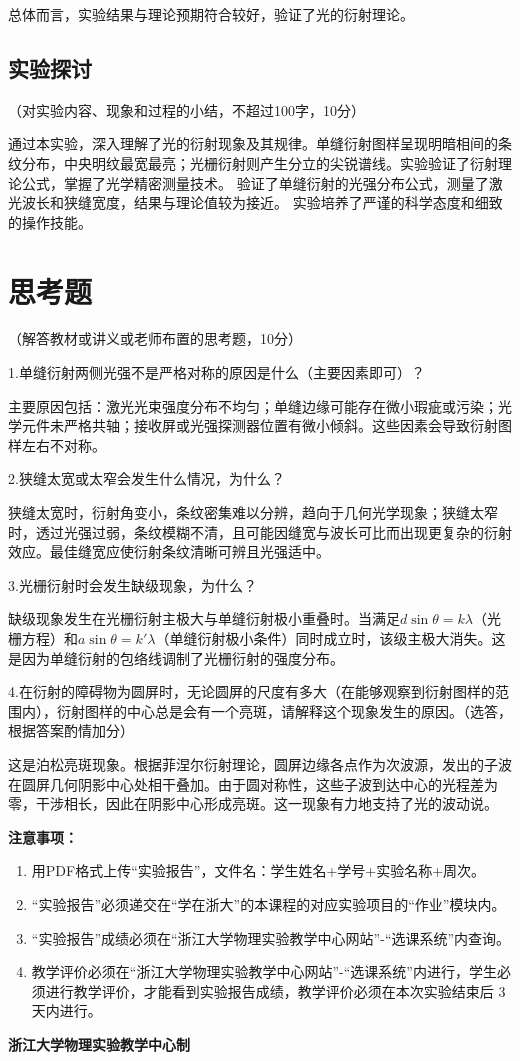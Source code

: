 \documentclass[10pt,a4paper]{ctexart}
\newcommand{\sihao}{\fontsize{14pt}{18pt}\selectfont}
\newcommand{\xiaosi}{\fontsize{12pt}{16pt}\selectfont}
\begin{document}
总体而言，实验结果与理论预期符合较好，验证了光的衍射理论。

    \subsection{实验探讨}
    \xiaosi （对实验内容、现象和过程的小结，不超过100字，10分）

    通过本实验，深入理解了光的衍射现象及其规律。单缝衍射图样呈现明暗相间的条纹分布，中央明纹最宽最亮；光栅衍射则产生分立的尖锐谱线。实验验证了衍射理论公式，掌握了光学精密测量技术。
    验证了单缝衍射的光强分布公式，测量了激光波长和狭缝宽度，结果与理论值较为接近。
    实验培养了严谨的科学态度和细致的操作技能。
\section{思考题}

    \xiaosi （解答教材或讲义或老师布置的思考题，10分）

1.单缝衍射两侧光强不是严格对称的原因是什么（主要因素即可）？

主要原因包括：激光光束强度分布不均匀；单缝边缘可能存在微小瑕疵或污染；光学元件未严格共轴；接收屏或光强探测器位置有微小倾斜。这些因素会导致衍射图样左右不对称。

2.狭缝太宽或太窄会发生什么情况，为什么？

狭缝太宽时，衍射角变小，条纹密集难以分辨，趋向于几何光学现象；狭缝太窄时，透过光强过弱，条纹模糊不清，且可能因缝宽与波长可比而出现更复杂的衍射效应。最佳缝宽应使衍射条纹清晰可辨且光强适中。

3.光栅衍射时会发生缺级现象，为什么？

缺级现象发生在光栅衍射主极大与单缝衍射极小重叠时。当满足$d\sin\theta = k\lambda$（光栅方程）和$a\sin\theta = k'\lambda$（单缝衍射极小条件）同时成立时，该级主极大消失。这是因为单缝衍射的包络线调制了光栅衍射的强度分布。

4.在衍射的障碍物为圆屏时，无论圆屏的尺度有多大（在能够观察到衍射图样的范围内），衍射图样的中心总是会有一个亮斑，请解释这个现象发生的原因。（选答，根据答案酌情加分）

这是泊松亮斑现象。根据菲涅尔衍射理论，圆屏边缘各点作为次波源，发出的子波在圆屏几何阴影中心处相干叠加。由于圆对称性，这些子波到达中心的光程差为零，干涉相长，因此在阴影中心形成亮斑。这一现象有力地支持了光的波动说。
\newpage

\sihao\textbf{注意事项：}
\xiaosi
\begin{enumerate}
    \item 用PDF格式上传“实验报告”，文件名：学生姓名+学号+实验名称+周次。
    \item  “实验报告”必须递交在“学在浙大”的本课程的对应实验项目的“作业”模块内。
    \item  “实验报告”成绩必须在“浙江大学物理实验教学中心网站”-“选课系统”内查询。
    \item 教学评价必须在“浙江大学物理实验教学中心网站”-“选课系统”内进行，学生必须进行教学评价，才能看到实验报告成绩，教学评价必须在本次实验结束后 3 天内进行。
\end{enumerate}

\vspace{1cm}
\xiaosi\centering \textbf{浙江大学物理实验教学中心制}
\end{document}
